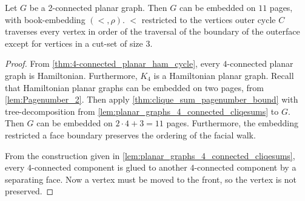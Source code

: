 \begin{corollary}\label{thm:Planar Graph Hickingbotham Bound}
	Let \(G\) be a 2-connected planar graph. Then $G$ can be embedded on $11$ pages, with book-embedding $(<, \rho)$. $<$ restricted to the vertices outer cycle $C$ traverses every vertex in order of the traversal of the boundary of the outerface except for vertices in a cut-set of size 3.
\end{corollary}
\begin{proof}
	From \cref{thm:4-connected_planar_ham_cycle}, every $4$-connected planar graph is Hamiltonian. Furthermore, $K_4$ is a Hamiltonian planar graph.
	Recall that Hamiltonian planar graphs can be embedded on two pages, from \cref{lem:Pagenumber_2}. 
	Then apply \cref{thm:clique_sum_pagenumber_bound} with tree-decomposition from \cref{lem:planar_graphs_4_connected_cliqesums} to $G$. Then $G$ can be embedded on \(2 \cdot 4 + 3 = 11\) pages. Furthermore, the embedding restricted a face boundary preserves the ordering of the facial walk.

	From the construction given in \cref{lem:planar_graphs_4_connected_cliqesums}, every $4$-connected component is glued to another $4$-connected component by a separating face. Now a vertex must be moved to the front, so the vertex is not preserved. 
\end{proof}

